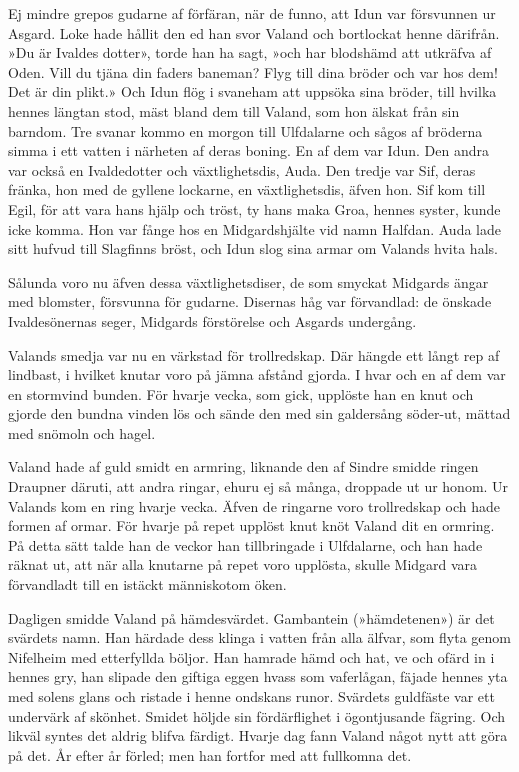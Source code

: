 Ej mindre grepos gudarne af förfäran, när de funno, att Idun var
försvunnen ur Asgard. Loke hade hållit den ed han svor Valand och
bortlockat henne därifrån. »Du är Ivaldes dotter», torde han ha sagt,
»och har blodshämd att utkräfva af Oden. Vill du tjäna din faders
baneman? Flyg till dina bröder och var hos dem! Det är din plikt.» Och
Idun flög i svaneham att uppsöka sina bröder, till hvilka hennes längtan
stod, mäst bland dem till Valand, som hon älskat från sin barndom. Tre
svanar kommo en morgon till Ulfdalarne och sågos af bröderna simma i ett
vatten i närheten af deras boning. En af dem var Idun. Den andra var
också en Ivaldedotter och växtlighetsdis, Auda. Den tredje var Sif,
deras fränka, hon med de gyllene lockarne, en växtlighetsdis, äfven hon.
Sif kom till Egil, för att vara hans hjälp och tröst, ty hans maka Groa,
hennes syster, kunde icke komma. Hon var fånge hos en Midgardshjälte vid
namn Halfdan. Auda lade sitt hufvud till Slagfinns bröst, och Idun slog
sina armar om Valands hvita hals.

Sålunda voro nu äfven dessa växtlighetsdiser, de som smyckat Midgards
ängar med blomster, försvunna för gudarne. Disernas håg var förvandlad:
de önskade Ivaldesönernas seger, Midgards förstörelse och Asgards
undergång.

Valands smedja var nu en värkstad för trollredskap. Där hängde ett långt
rep af lindbast, i hvilket knutar voro på jämna afstånd gjorda. I hvar
och en af dem var en stormvind bunden. För hvarje vecka, som gick,
upplöste han en knut och gjorde den bundna vinden lös och sände den med
sin galdersång söder-ut, mättad med snömoln och hagel.

Valand hade af guld smidt en armring, liknande den af Sindre smidde
ringen Draupner däruti, att andra ringar, ehuru
\protect\hypertarget{lb1625905.xhtmlux5cux23start83}{}{}\protect\hypertarget{lb1625905.xhtmlux5cux23start83-a}{}{}\protect\hypertarget{lb1625905.xhtmlux5cux23start83-b}{}{}\protect\hypertarget{lb1625905.xhtmlux5cux23start83-c}{}{}\protect\hypertarget{lb1625905.xhtmlux5cux23start83-d}{}{}
ej så många, droppade ut ur honom. Ur Valands kom en ring hvarje vecka.
Äfven de ringarne voro trollredskap och hade formen af ormar. För hvarje
på repet upplöst knut knöt Valand dit en ormring. På detta sätt talde
han de veckor han tillbringade i Ulfdalarne, och han hade räknat ut, att
när alla knutarne på repet voro upplösta, skulle Midgard vara
förvandladt till en istäckt människotom öken.

Dagligen smidde Valand på hämdesvärdet. Gambantein (»hämdetenen») är det
svärdets namn. Han härdade dess klinga i vatten från alla älfvar, som
flyta genom Nifelheim med etterfyllda böljor. Han hamrade hämd och hat,
ve och ofärd in i hennes gry, han slipade den giftiga eggen hvass som
vaferlågan, fäjade hennes yta med solens glans och ristade i henne
ondskans runor. Svärdets guldfäste var ett undervärk af skönhet. Smidet
höljde sin fördärflighet i ögontjusande fägring. Och likväl syntes det
aldrig blifva färdigt. Hvarje dag fann Valand något nytt att göra på
det. År efter år förled; men han fortfor med att fullkomna det.

